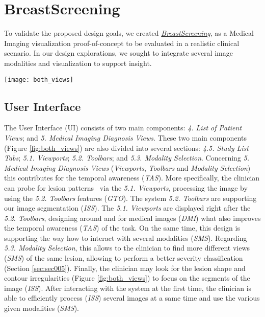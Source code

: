 \section{BreastScreening}
\label{sec:sec004}
To validate the proposed design goals, we created \href{https://breastscreening.github.io/}{{\it BreastScreening}}, as a Medical Imaging visualization proof-of-concept to be evaluated in a realistic clinical scenario.
In our design explorations, we sought to integrate several image modalities and visualization to support insight.

\begin{figure*}[htbp]
\centering
\texttt{[image: both\_views]}
\caption{\scriptsize \textit{Single-Modality} (left) and \textit{Multi-Modality} (right) Views. The UI components are as follows: \textit{4. List of Patient Views}; and \textit{4.5. Study List Tabs}; as well as \textit{5. Medical Imaging Diagnosis Views}; \textit{5.1. Viewports}; \textit{5.2. Toolbars}; and \textit{5.3. Modality Selection}.}
\label{fig:both_views}
\end{figure*}

\subsection{User Interface}

The User Interface (UI) consists of two main components:
\textit{4. List of Patient Views}; and
\textit{5. Medical Imaging Diagnosis Views}.
These two main components (Figure \ref{fig:both_views}) are also divided into several sections:
\textit{4.5. Study List Tabs};
\textit{5.1. Viewports};
\textit{5.2. Toolbars}; and
\textit{5.3. Modality Selection}.
Concerning \textit{5. Medical Imaging Diagnosis Views} ({\em Viewports}, {\em Toolbars} and {\em Modality Selection}) this contributes for the temporal awareness (\textit{TAS}).
More specifically, the clinician can probe for lesion patterns~\cite{10.1007/978-3-030-00928-1_62} via the \textit{5.1. Viewports}, processing the image by using the \textit{5.2. Toolbars} features (\textit{GTO}).
The system \textit{5.2. Toolbars} are supporting our image segmentation (\textit{ISS}).
The \textit{5.1. Viewports} are displayed right after the \textit{5.2. Toolbars}, designing around and for medical images (\textit{DMI}) what also improves the temporal awareness (\textit{TAS}) of the task.
On the same time, this design is supporting the way how to interact with several modalities (\textit{SMS}).
Regarding \textit{5.3. Modality Selection}, this allows to the clinician to find more different views (\textit{SMS}) of the same lesion, allowing to perform a better severity classification (Section \ref{sec:sec005}).
Finally, the clinician may look for the lesion shape and contour irregularities (Figure \ref{fig:both_views}) to focus on the segments of the image (\textit{ISS}).
After interacting with the system at the first time, the clinician is able to efficiently process (\textit{ISS}) several images at a same time and use the various given modalities (\textit{SMS}).

